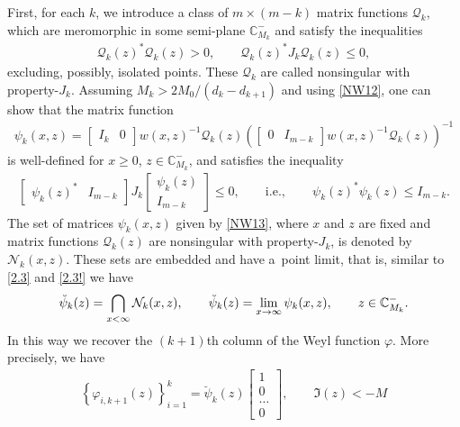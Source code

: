 \documentclass[11pt]{article}
\def\BC{{\mathbb C}}
\newcommand{\cN}{{\mathcal N}}
\newcommand{\cQ}{{\mathcal Q}}
\numberwithin{equation}{section}
\begin{document}
First, for each $ k $, we introduce a class of
$m \times (m-k)$ matrix functions $\cQ_k$, which are meromorphic in some semi-plane $\BC^{-}_{M_k}$ and satisfy the inequalities
\begin{gather}
\cQ_k (z)^*
  \cQ_k(z)
 > 0, \qquad
  \cQ_k (z)^*
  J_k
  \cQ_k (z)
\leq 0,
 \label{NW12}
\end{gather}
excluding, possibly, isolated points. These $\cQ_k$ are called nonsingular with property-$J_k$.
Assu\-ming $M_k>2M_0/(d_k-d_{k+1})$ and using \eqref{NW12}, one can show that the matrix function
\begin{gather}
  \psi_k (x,z)
= \begin{bmatrix}I_k &0 \end{bmatrix}
 w (x,z)^{-1}
 \cQ_k (z)
 \left(
  \begin{bmatrix}0 &I_{m-k} \end{bmatrix}
  w (x,z)^{-1}
  \cQ_k(z)
 \right)^{-1}
 \label{NW13}
\end{gather}
is well-def\/ined for $x \geq 0$, $z \in \BC^{-}_{M_k}$, and satisf\/ies the inequality
\begin{gather}
\begin{bmatrix} \psi_k (z)^* &I_{m-k} \end{bmatrix}
 J_k
 \left[
  \begin{matrix}
    \psi_k (z) \\
    I_{m-k}
  \end{matrix}
 \right]
\leq 0 , \qquad {\mathrm{i.e.,}} \qquad \psi_k (z)^*
  \psi_k (z)
\leq I_{m-k} .
 \label{NW14}
\end{gather}
The set of matrices $\psi_k(x,z)$ given by \eqref{NW13}, where $x$ and $z$ are f\/ixed and matrix functions $\cQ_k(z)$ are nonsingular with property-$J_k$, is denoted
by $\cN_k(x,z)$. These sets are embedded and have a~point limit, that is, similar to \eqref{2.3} and \eqref{2.3!} we have
 \begin{gather}
  \breve \psi_k(z) = \bigcap\limits_{x < \infty}
           {\cal N}_k (x,z), \qquad \breve \psi_k(z)=\lim_{x\to \infty} \psi_k(x,z),
\qquad
  z \in \BC_{M_k}^{-} .
 \label{NW15}
\end{gather}
In this way we recover the $(k+1)$th column of the Weyl function $\varphi$. More precisely, we have
\begin{gather}
  \left\{
   \varphi_{i, k+1}(z)
  \right\}_{i=1}^k
 = \breve \psi_k (z)\begin{bmatrix} 1\\ 0 \\ \ldots \\0
 \end{bmatrix}, \qquad \Im(z)<-M \label{NW16}
\end{gather}
\end{document}
